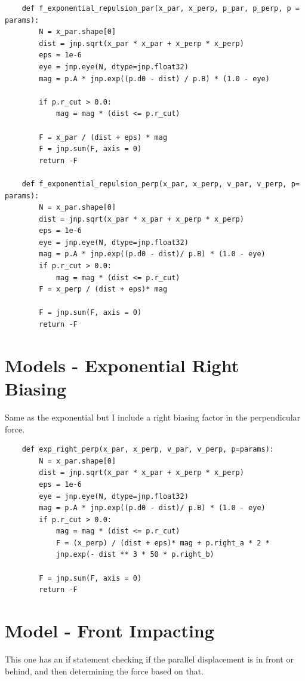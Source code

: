 \documentclass{article}
\begin{document}
\begin{lstlisting}
    def f_exponential_repulsion_par(x_par, x_perp, p_par, p_perp, p = params):
        N = x_par.shape[0]
        dist = jnp.sqrt(x_par * x_par + x_perp * x_perp)
        eps = 1e-6
        eye = jnp.eye(N, dtype=jnp.float32)
        mag = p.A * jnp.exp((p.d0 - dist) / p.B) * (1.0 - eye)

        if p.r_cut > 0.0:
            mag = mag * (dist <= p.r_cut)

        F = x_par / (dist + eps) * mag 
        F = jnp.sum(F, axis = 0)
        return -F
    
    def f_exponential_repulsion_perp(x_par, x_perp, v_par, v_perp, p= params):
        N = x_par.shape[0]
        dist = jnp.sqrt(x_par * x_par + x_perp * x_perp)
        eps = 1e-6
        eye = jnp.eye(N, dtype=jnp.float32)
        mag = p.A * jnp.exp((p.d0 - dist)/ p.B) * (1.0 - eye)
        if p.r_cut > 0.0:
            mag = mag * (dist <= p.r_cut)
        F = x_perp / (dist + eps)* mag 
        
        F = jnp.sum(F, axis = 0)
        return -F

\end{lstlisting}

\newpage
\section{Models - Exponential Right Biasing}
Same as the exponential but I include a right biasing factor in the perpendicular force.
\begin{lstlisting}
    def exp_right_perp(x_par, x_perp, v_par, v_perp, p=params):
        N = x_par.shape[0]
        dist = jnp.sqrt(x_par * x_par + x_perp * x_perp)
        eps = 1e-6
        eye = jnp.eye(N, dtype=jnp.float32)
        mag = p.A * jnp.exp((p.d0 - dist)/ p.B) * (1.0 - eye)
        if p.r_cut > 0.0:
            mag = mag * (dist <= p.r_cut)
            F = (x_perp) / (dist + eps)* mag + p.right_a * 2 * 
            jnp.exp(- dist ** 3 * 50 * p.right_b)
        
        F = jnp.sum(F, axis = 0)
        return -F
\end{lstlisting}
 
\section{Model - Front Impacting}
This one has an if statement checking if the parallel displacement is in front or behind, and then determining the force based on that.
\end{document}
